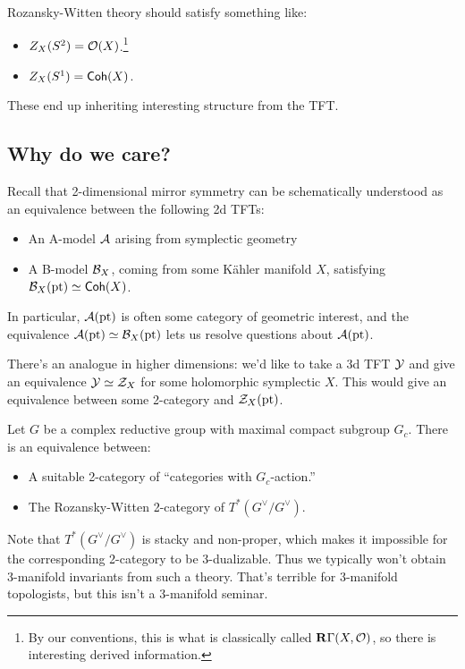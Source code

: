 \documentclass{article}
\begin{document}
Rozansky-Witten theory should satisfy something like:
\begin{itemize}
	\item $Z_X(S^2) = \mathcal{O}(X)$.\footnote{By our conventions, this is what is classically called $\mathbf{R} \Gamma(X, \mathcal{O})$, so there is interesting derived information.}
	\item $Z_X(S^1) = \mathsf{Coh}(X)$.
\end{itemize}
These end up inheriting interesting structure from the TFT.

\subsection{Why do we care?}

Recall that 2-dimensional mirror symmetry can be schematically understood as an equivalence between the following 2d TFTs:
\begin{itemize}
	\item An A-model $\mathcal{A}$ arising from symplectic geometry
	\item A B-model $\mathcal{B}_X$, coming from some K\"ahler manifold $X$, satisfying $\mathcal{B}_X(\operatorname{pt}) \simeq \mathsf{Coh}(X)$.
\end{itemize}
In particular, $\mathcal{A}(\operatorname{pt})$ is often some category of geometric interest, and the equivalence $\mathcal{A}(\operatorname{pt}) \simeq \mathcal{B}_X(\operatorname{pt})$ lets us resolve questions about $\mathcal{A}(\operatorname{pt})$.

There's an analogue in higher dimensions: we'd like to take a 3d TFT $\mathcal{Y}$ and give an equivalence $\mathcal{Y} \simeq \mathcal{Z}_X$ for some holomorphic symplectic $X$.
This would give an equivalence between some 2-category and $\mathcal{Z}_X(\operatorname{pt})$.

\begin{conj}[Teleman]
	Let $G$ be a complex reductive group with maximal compact subgroup $G_c$.
	There is an equivalence between:
	\begin{itemize}
		\item A suitable 2-category of ``categories with $G_c$-action.''
		\item The Rozansky-Witten 2-category of $T^*(G^\vee / G^\vee)$.
	\end{itemize}
\end{conj}

Note that $T^*(G^\vee / G^\vee)$ is stacky and non-proper, which makes it impossible for the corresponding 2-category to be 3-dualizable.
Thus we typically won't obtain 3-manifold invariants from such a theory.
That's terrible for 3-manifold topologists, but this isn't a 3-manifold seminar.
\end{document}
